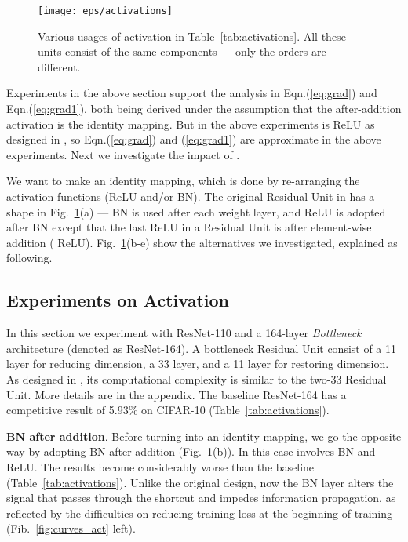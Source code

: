 \documentclass[runningheads]{llncs}
\begin{document}
\begin{figure}[t]
\centering
\texttt{[image: eps/activations]}
\caption{Various usages of activation in Table~\ref{tab:activations}. All these units consist of the same components --- only the orders are different.}
\label{fig:activations}
\end{figure}




Experiments in the above section support the analysis in Eqn.(\ref{eq:grad}) and Eqn.(\ref{eq:grad1}), both being derived under the assumption that the after-addition activation  is the identity mapping. But in the above experiments  is ReLU as designed in \cite{He2016}, so Eqn.(\ref{eq:grad}) and (\ref{eq:grad1}) are approximate in the above experiments. Next we investigate the impact of .

We want to make  an identity mapping, which is done by re-arranging the activation functions (ReLU and/or BN). The original Residual Unit in \cite{He2016} has a shape in Fig.~\ref{fig:activations}(a) --- BN is used after each weight layer, and ReLU is adopted after BN except that the last ReLU in a Residual Unit is after element-wise addition (  ReLU). Fig.~\ref{fig:activations}(b-e) show the alternatives we investigated, explained as following.


\subsection{Experiments on Activation}

In this section we experiment with ResNet-110 and a 164-layer \emph{Bottleneck} \cite{He2016} architecture (denoted as ResNet-164). A bottleneck Residual Unit consist of a 11 layer for reducing dimension, a 33 layer, and a 11 layer for restoring dimension. As designed in \cite{He2016}, its computational complexity is similar to the two-33 Residual Unit. More details are in the appendix.
The baseline ResNet-164 has a competitive result of 5.93\% on CIFAR-10 (Table~\ref{tab:activations}).

\textbf{BN after addition}. Before turning  into an identity mapping, we go the opposite way by adopting BN after addition (Fig.~\ref{fig:activations}(b)). In this case  involves BN and ReLU.
The results become considerably worse than the baseline (Table~\ref{tab:activations}). Unlike the original design, now the BN layer alters the signal that passes through the shortcut and impedes information propagation, as reflected by the difficulties on reducing training loss at the beginning of training (Fib.~\ref{fig:curves_act} left).
\end{document}
